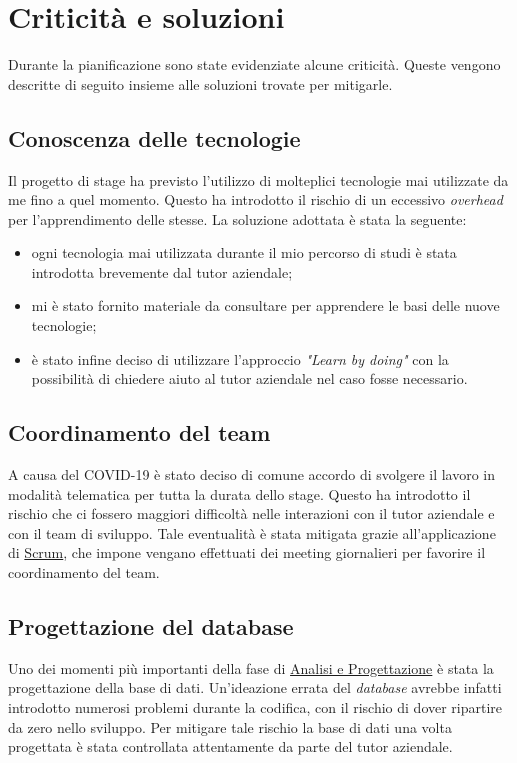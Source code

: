 \section{Criticità e soluzioni}
Durante la pianificazione sono state evidenziate alcune criticità. Queste vengono descritte di seguito insieme alle soluzioni trovate per mitigarle.

\subsection*{Conoscenza delle tecnologie}
Il progetto di stage ha previsto l'utilizzo di molteplici tecnologie mai utilizzate da me fino a quel momento. Questo ha introdotto il rischio di un eccessivo \textit{overhead} per l'apprendimento delle stesse. La soluzione adottata è stata la seguente:
\begin{itemize}
    \item ogni tecnologia mai utilizzata durante il mio percorso di studi è stata introdotta brevemente dal tutor aziendale;
    \item mi è stato fornito materiale da consultare per apprendere le basi delle nuove tecnologie;
    \item è stato infine deciso di utilizzare l'approccio \textit{"Learn by doing"} con la possibilità di chiedere aiuto al tutor aziendale nel caso fosse necessario.
\end{itemize} 

\subsection*{Coordinamento del team}
A causa del COVID-19 è stato deciso di comune accordo di svolgere il lavoro in modalità telematica per tutta la durata dello stage. Questo ha introdotto il rischio che ci fossero maggiori difficoltà nelle interazioni con il tutor aziendale e con il team di sviluppo. Tale eventualità è stata mitigata grazie all'applicazione di \hyperref[sez:scrum]{Scrum}, che impone vengano effettuati dei meeting giornalieri per favorire il coordinamento del team.

\subsection*{Progettazione del database}
Uno dei momenti più importanti della fase di \hyperref[cap:analisi]{Analisi e Progettazione} è stata la progettazione della base di dati. Un'ideazione errata del \textit{database} avrebbe infatti introdotto numerosi problemi durante la codifica, con il rischio di dover ripartire da zero nello sviluppo. Per mitigare tale rischio la base di dati una volta progettata è stata controllata attentamente da parte del tutor aziendale.

